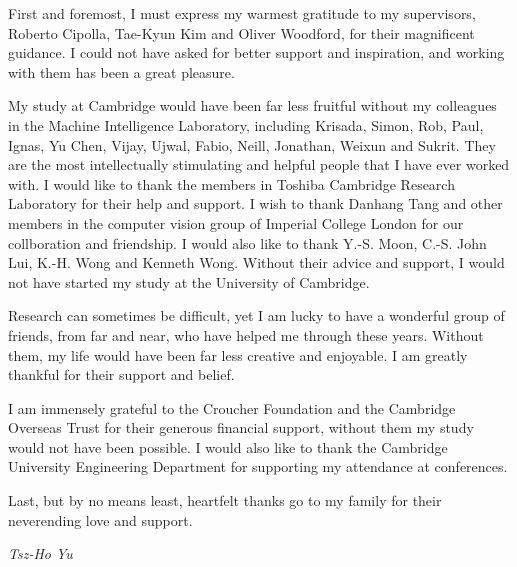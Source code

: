 \begin{acknowledgements}
	
First and foremost, I must express my warmest gratitude to my supervisors, Roberto Cipolla, Tae-Kyun Kim and Oliver Woodford, for their magnificent guidance. I could not have asked for better support and inspiration, and working with them has been a great pleasure.  

My study at Cambridge would have been far less fruitful without my colleagues in the Machine Intelligence Laboratory, including Krisada, Simon, Rob, Paul, Ignas, Yu Chen, Vijay, Ujwal, Fabio, Neill, Jonathan, Weixun and Sukrit. They are the most intellectually stimulating and helpful people that I have ever worked with. I would like to thank the members in Toshiba Cambridge Research Laboratory for their help and support. I wish to thank Danhang Tang and other members in the computer vision group of Imperial College London for our collboration and friendship. I would also like to thank Y.-S. Moon, C.-S. John Lui, K.-H. Wong and Kenneth Wong. Without their advice and support, I would not have started my study at the University of Cambridge. 

Research can sometimes be difficult, yet I am lucky to have a wonderful group of friends, from far and near, who have helped me through these years. Without them, my life would have been far less creative and enjoyable. I am greatly thankful for their support and belief.  

I am immensely grateful to the Croucher Foundation and the Cambridge Overseas Trust for their generous financial support, without them my study would not have been possible. I would also like to thank the Cambridge University Engineering Department for supporting my attendance at conferences.  

Last, but by no means least, heartfelt thanks go to my family for their neverending love and support.  

\hfill {\raggedright \Large{\textit{Tsz-Ho Yu}}}

\end{acknowledgements}
